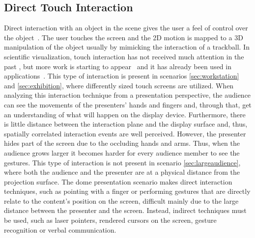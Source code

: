 \documentclass[review,journal]{vgtc}         %
\begin{document}
\subsection{Direct Touch Interaction}
Direct interaction with an object in the scene gives the user a feel of control over the object~\cite{isenberg2009studying}. 
The user touches the screen and the 2D motion is mapped to a 3D manipulation of the object usually by mimicking the interaction of a trackball.
In scientific visualization, touch interaction has not received much attention in the past \cite{isenberg:hal-00781512}, but more work is starting to appear~\cite{Klein:2012:DSD:2322389.2322403} and it has already been used in applications~\cite{LRFPY11}.
This type of interaction is present in scenarios \ref{sec:workstation} and \ref{sec:exhibition}, where differently sized touch screens are utilized. 
When analyzing this interaction technique from a presentation perspective, the audience can see the movements of the presenters' hands and fingers and, through that, get an understanding of what will happen on the display device.
Furthermore, there is little distance between the interaction plane and the display surface and, thus, spatially correlated interaction events are well perceived.
However, the presenter hides part of the screen due to the occluding hands and arms.
Thus, when the audience grows larger it becomes harder for every audience member to see the gestures.
This type of interaction is not present in scenario \ref{sec:largeaudience}, where both the audience and the presenter are at a physical distance from the projection surface.
The dome presentation scenario makes direct interaction techniques, such as pointing with a finger or performing gestures that are directly relate to the content's position on the screen, difficult mainly due to the large distance between the presenter and the screen.
Instead, indirect techniques must be used, such as laser pointers, rendered cursors on the screen, gesture recognition or verbal communication.
\end{document}
